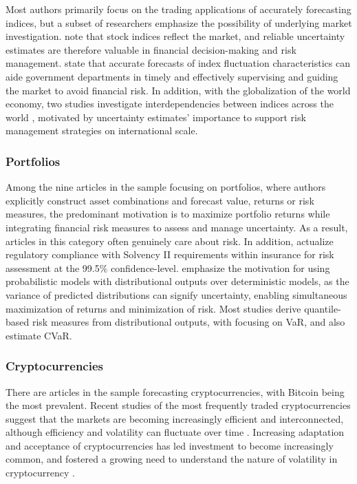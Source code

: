 Most authors primarily focus on the trading applications of accurately forecasting indices, but a subset of researchers emphasize the possibility of underlying market investigation. \textcite{Suphawan2022gpr} note that stock indices reflect the market, and reliable uncertainty estimates are therefore valuable in financial decision-making and risk management. \textcite{Wang2021gprensemble} state that accurate forecasts of index fluctuation characteristics can aide government departments in timely and effectively supervising and guiding the market to avoid financial risk. In addition, with the globalization of the world economy, two studies investigate interdependencies between indices across the world \parencite{cao2019multi, Malagrino2018Forecasting}, motivated by uncertainty estimates' importance to support risk management strategies on international scale.

\subsubsection{Portfolios}
Among the nine articles in the sample focusing on portfolios, where authors explicitly construct asset combinations and forecast value, returns or risk measures, the predominant motivation is to maximize portfolio returns while integrating financial risk measures to assess and manage uncertainty. As a result, articles in this category often genuinely care about risk. In addition, \textcite{Risk2018gpr} actualize regulatory compliance with Solvency II requirements within insurance for risk assessment at the 99.5\% confidence-level. \textcite{kim2023portfolio} emphasize the motivation for using probabilistic models with distributional outputs over deterministic models, as the variance of predicted distributions can signify uncertainty, enabling simultaneous maximization of returns and minimization of risk. Most studies derive quantile-based risk measures from distributional outputs, with \textcite{Fatouros2023DeepVaR, arian2022encoded, caprioli2023quantifying} focusing on VaR, and \textcite{Risk2018gpr, Min2023BlackLitterman} also estimate CVaR.

\subsubsection{Cryptocurrencies}
There are \cryptoarticles articles in the sample forecasting cryptocurrencies, with Bitcoin being the most prevalent. Recent studies of the most frequently traded cryptocurrencies suggest that the markets are becoming increasingly efficient and interconnected, although efficiency and volatility can fluctuate over time \parencite{noda2021evolution, liu2019volatility, gupta2022empirical}. Increasing adaptation and acceptance of cryptocurrencies has led investment to become increasingly common, and fostered a growing need to understand the nature of volatility in cryptocurrency \parencite{gupta2022empirical}.


